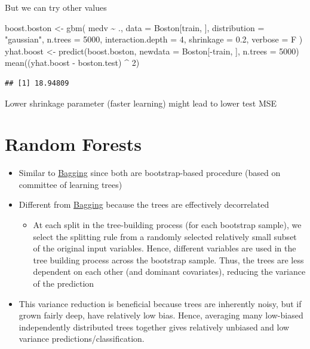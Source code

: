 \documentclass[
]{book}
\newenvironment{Shaded}{\begin{snugshade}}{\end{snugshade}}
\newcommand{\AttributeTok}[1]{\textcolor[rgb]{0.77,0.63,0.00}{#1}}
\newcommand{\DecValTok}[1]{\textcolor[rgb]{0.00,0.00,0.81}{#1}}
\newcommand{\FloatTok}[1]{\textcolor[rgb]{0.00,0.00,0.81}{#1}}
\newcommand{\FunctionTok}[1]{\textcolor[rgb]{0.00,0.00,0.00}{#1}}
\newcommand{\NormalTok}[1]{#1}
\newcommand{\OtherTok}[1]{\textcolor[rgb]{0.56,0.35,0.01}{#1}}
\newcommand{\SpecialCharTok}[1]{\textcolor[rgb]{0.00,0.00,0.00}{#1}}
\newcommand{\StringTok}[1]{\textcolor[rgb]{0.31,0.60,0.02}{#1}}
\providecommand{\tightlist}{%
  \setlength{\itemsep}{0pt}\setlength{\parskip}{0pt}}
\begin{document}
But we can try other values

\begin{Shaded}
\begin{Highlighting}[]
\NormalTok{boost.boston }\OtherTok{\textless{}{-}}
    \FunctionTok{gbm}\NormalTok{(}
\NormalTok{        medv }\SpecialCharTok{\textasciitilde{}}\NormalTok{ .,}
        \AttributeTok{data =}\NormalTok{ Boston[train, ],}
        \AttributeTok{distribution =} \StringTok{"gaussian"}\NormalTok{,}
        \AttributeTok{n.trees =} \DecValTok{5000}\NormalTok{,}
        \AttributeTok{interaction.depth =} \DecValTok{4}\NormalTok{,}
        \AttributeTok{shrinkage =} \FloatTok{0.2}\NormalTok{,}
        \AttributeTok{verbose =}\NormalTok{ F}
\NormalTok{    )}
\NormalTok{yhat.boost }\OtherTok{\textless{}{-}}
    \FunctionTok{predict}\NormalTok{(boost.boston, }\AttributeTok{newdata =}\NormalTok{ Boston[}\SpecialCharTok{{-}}\NormalTok{train, ], }\AttributeTok{n.trees =} \DecValTok{5000}\NormalTok{)}
\FunctionTok{mean}\NormalTok{((yhat.boost }\SpecialCharTok{{-}}\NormalTok{ boston.test) }\SpecialCharTok{\^{}} \DecValTok{2}\NormalTok{)}
\end{Highlighting}
\end{Shaded}

\begin{verbatim}
## [1] 18.94809
\end{verbatim}

Lower shrinkage parameter (faster learning) might lead to lower test MSE

\hypertarget{random-forests}{%
\chapter{Random Forests}\label{random-forests}}

\begin{itemize}
\item
  Similar to \protect\hyperlink{bagging}{Bagging} since both are bootstrap-based procedure (based on committee of learning trees)
\item
  Different from \protect\hyperlink{bagging}{Bagging} because the trees are effectively decorrelated

  \begin{itemize}
  \tightlist
  \item
    At each split in the tree-building process (for each bootstrap sample), we select the splitting rule from a randomly selected relatively small subset of the original input variables. Hence, different variables are used in the tree building process across the bootstrap sample. Thus, the trees are less dependent on each other (and dominant covariates), reducing the variance of the prediction
  \end{itemize}
\item
  This variance reduction is beneficial because trees are inherently noisy, but if grown fairly deep, have relatively low bias. Hence, averaging many low-biased independently distributed trees together gives relatively unbiased and low variance predictions/classification.
\end{itemize}
\end{document}
